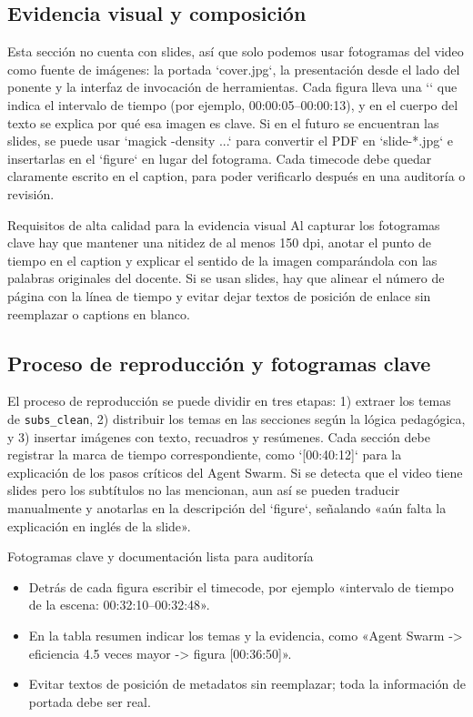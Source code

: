 \documentclass[a4paper]{article}
\begin{document}
\subsection{Evidencia visual y composición}
Esta sección no cuenta con slides, así que solo podemos usar fotogramas del video como fuente de imágenes: la portada `cover.jpg`, la presentación desde el lado del ponente y la interfaz de invocación de herramientas. Cada figura lleva una `\protect\footnotemark` que indica el intervalo de tiempo (por ejemplo, 00:00:05--00:00:13), y en el cuerpo del texto se explica por qué esa imagen es clave. Si en el futuro se encuentran las slides, se puede usar `magick -density ...` para convertir el PDF en `slide-*.jpg` e insertarlas en el `figure` en lugar del fotograma. Cada timecode debe quedar claramente escrito en el caption, para poder verificarlo después en una auditoría o revisión.

\begin{importantbox}{Requisitos de alta calidad para la evidencia visual}
Al capturar los fotogramas clave hay que mantener una nitidez de al menos 150 dpi, anotar el punto de tiempo en el caption y explicar el sentido de la imagen comparándola con las palabras originales del docente. Si se usan slides, hay que alinear el número de página con la línea de tiempo y evitar dejar textos de posición de enlace sin reemplazar o captions en blanco.
\end{importantbox}

\subsection{Proceso de reproducción y fotogramas clave}
El proceso de reproducción se puede dividir en tres etapas: 1) extraer los temas de \texttt{subs\_clean}, 2) distribuir los temas en las secciones según la lógica pedagógica, y 3) insertar imágenes con texto, recuadros y resúmenes. Cada sección debe registrar la marca de tiempo correspondiente, como `[00:40:12]` para la explicación de los pasos críticos del Agent Swarm. Si se detecta que el video tiene slides pero los subtítulos no las mencionan, aun así se pueden traducir manualmente y anotarlas en la descripción del `figure`, señalando «aún falta la explicación en inglés de la slide».

\begin{knowledgebox}{Fotogramas clave y documentación lista para auditoría}
\begin{itemize}
    \item Detrás de cada figura escribir el timecode, por ejemplo «intervalo de tiempo de la escena: 00:32:10--00:32:48».
    \item En la tabla resumen indicar los temas y la evidencia, como «Agent Swarm -> eficiencia 4.5 veces mayor -> figura [00:36:50]».
    \item Evitar textos de posición de metadatos sin reemplazar; toda la información de portada debe ser real.
\end{itemize}
\end{knowledgebox}
\end{document}

